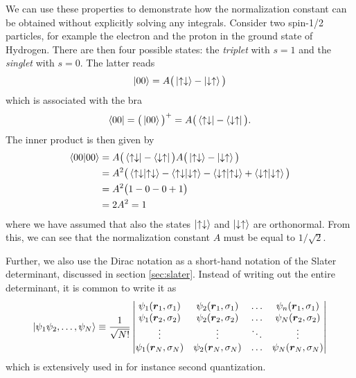 We can use these properties to demonstrate how the normalization constant can be obtained without explicitly solving any integrals. Consider two spin-1/2 particles, for example the electron and the proton in the ground state of Hydrogen. There are then four possible states: the \textit{triplet} with $s=1$ and the \textit{singlet} with $s=0$. The latter reads \cite{griffiths_introduction_2005}
\begin{equation}
\ket{00}=A\big(\ket{\uparrow\downarrow}-\ket{\downarrow\uparrow}\big)
\end{equation}
which is associated with the bra
\begin{equation}
\bra{00}=\big(\ket{00}\big)^+=A\big(\bra{\uparrow\downarrow}-\bra{\downarrow\uparrow}\big).
\end{equation}
The inner product is then given by
\begin{equation}
\begin{aligned}
\braket{00}{00}&=A\big(\bra{\uparrow\downarrow}-\bra{\downarrow\uparrow}\big)A\big(\ket{\uparrow\downarrow}-\ket{\downarrow\uparrow}\big)\\
&=A^2\big(\braket{\uparrow\downarrow}{\uparrow\downarrow}-\braket{\uparrow\downarrow}{\downarrow\uparrow}-\braket{\downarrow\uparrow}{\uparrow\downarrow}+\braket{\downarrow\uparrow}{\downarrow\uparrow}\big)\\
&=A^2\big(1-0-0+1\big)\\
&=2A^2=1
\end{aligned}
\end{equation}
where we have assumed that also the states $\ket{\uparrow\downarrow}$ and $\ket{\downarrow\uparrow}$ are orthonormal. From this, we can see that the normalization constant $A$ must be equal to $1/\sqrt{2}$.

Further, we also use the Dirac notation as a short-hand notation of the Slater determinant, discussed in section \ref{sec:slater}. Instead of writing out the entire determinant, it is common to write it as
\begin{equation}
\ket{\psi_1\psi_2,\hdots,\psi_N}\equiv\frac{1}{\sqrt{N!}}
\begin{vmatrix}
\psi_1(\boldsymbol{r}_1,\sigma_1) & \psi_2(\boldsymbol{r}_1,\sigma_1) & \hdots & \psi_n(\boldsymbol{r}_1,\sigma_1)\\
\psi_1(\boldsymbol{r}_2,\sigma_2) & \psi_2(\boldsymbol{r}_2,\sigma_2) & \hdots & \psi_N(\boldsymbol{r}_2,\sigma_2)\\
\vdots & \vdots & \ddots & \vdots \\
\psi_1(\boldsymbol{r}_N,\sigma_N) & \psi_2(\boldsymbol{r}_N,\sigma_N) & \hdots & \psi_N(\boldsymbol{r}_N,\sigma_N)
\end{vmatrix}
\end{equation}
which is extensively used in for instance second quantization. 